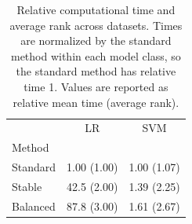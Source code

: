 \begin{table}
\caption{Relative computational time and average rank across datasets. Times are normalized by the standard method within each model class, so the standard method has relative time 1. Values are reported as relative mean time (average rank).}
\label{tab:relative_computational_time}
\begin{tabular}{lcc}
\toprule
 & LR & SVM \\
Method &  &  \\
\midrule
Standard & 1.00 (1.00) & 1.00 (1.07) \\
Stable & 42.5 (2.00) & 1.39 (2.25) \\
Balanced & 87.8 (3.00) & 1.61 (2.67) \\
\bottomrule
\end{tabular}
\end{table}
